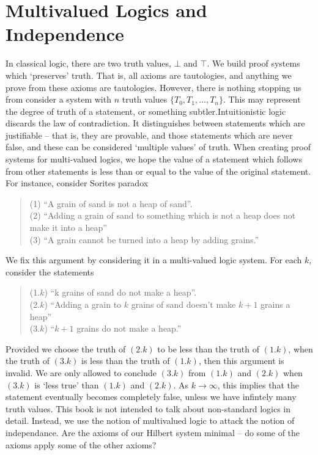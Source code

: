 \section{Multivalued Logics and Independence}

In classical logic, there are two truth values, $\bot$ and $\top$. We build proof systems which `preserves' truth. That is, all axioms are tautologies, and anything we prove from these axioms are tautologies. However, there is nothing stopping us from consider a system with $n$ truth values $\{ T_0, T_1, \dots, T_n \}$. This may represent the degree of truth of a statement, or something subtler.Intuitionistic logic discards the law of contradiction. It distinguishes between statements which are justifiable -- that is, they are provable, and those statements which are never false, and these can be considered `multiple values' of truth. When creating proof systems for multi-valued logics, we hope the value of a statement which follows from other statements is less than or equal to the value of the original statement. For instance, consider Sorites paradox
%
\begin{quote}
    (1) ``A grain of sand is not a heap of sand''.\\
    (2) ``Adding a grain of sand to something which is not a heap does not make it into a heap''\\
    (3) ``A grain cannot be turned into a heap by adding grains.''
\end{quote}
%
We fix this argument by considering it in a multi-valued logic system. For each $k$, consider the statements
%
\begin{quote}
    (1.$k$) ``k grains of sand do not make a heap''.\\
    (2.$k$) ``Adding a grain to $k$ grains of sand doesn't make $k+1$ grains a heap''\\
    (3.$k$) ``$k+1$ grains do not make a heap.''
\end{quote}
%
Provided we choose the truth of $(2.k)$ to be less than the truth of $(1.k)$, when the truth of $(3.k)$ is less than the truth of $(1.k)$, then this argument is invalid. We are only allowed to conclude $(3.k)$ from $(1.k)$ and $(2.k)$ when $(3.k)$ is `less true' than $(1.k)$ and $(2.k)$. As $k \to \infty$, this implies that the statement eventually becomes completely false, unless we have infintely many truth values. This book is not intended to talk about non-standard logics in detail. Instead, we use the notion of multivalued logic to attack the notion of independance. Are the axioms of our Hilbert system minimal -- do some of the axioms apply some of the other axioms?

